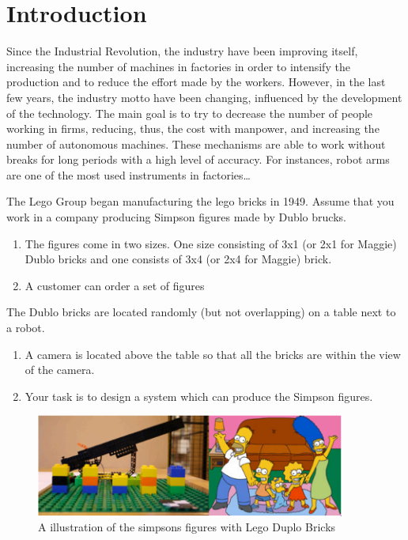 \chapter{Introduction}\label{ch:introduction}

Since the Industrial Revolution, the industry have been improving itself, increasing the number of machines in factories in order to intensify the production and to reduce the effort made by the workers. However, in the last few years, the industry motto have been changing, influenced by the development of the technology. The main goal is to try to decrease the number of people working in firms, reducing, thus, the cost with manpower, and increasing the number of autonomous machines. These mechanisms are able to work without breaks for long periods with a high level of accuracy. For instances, robot arms are one of the most used instruments in factories…


The Lego Group began manufacturing the lego bricks in 1949. 
Assume that you work in a company producing Simpson figures made by Dublo brucks.

\begin{enumerate}
	\item The figures come in two sizes. One size consisting of 3x1 (or 2x1 for Maggie) Dublo bricks and one consists of 3x4 (or 2x4 for Maggie) brick.
	\item A customer can order a set of figures
\end{enumerate}

The Dublo bricks are located randomly (but not
overlapping) on a table next to a robot.

\begin{enumerate}
	\item A camera is located above the table so that all the
	bricks are within the view of the camera.
	\item Your task is to design a system which can produce
	the Simpson figures. 
\end{enumerate}

\begin{figure}[hb]
  \centering
  \includegraphics[width=4in]{figures/simpsonLegoBricks.png}
  \caption[Simpsons figures Lego Bricks] {A illustration of the simpsons figures with Lego Duplo Bricks}
\end{figure}

